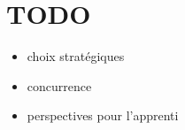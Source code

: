\section*{TODO}
\begin{itemize}
\item{choix stratégiques}
\item{concurrence}
\item{perspectives pour l'apprenti}
\end{itemize}

